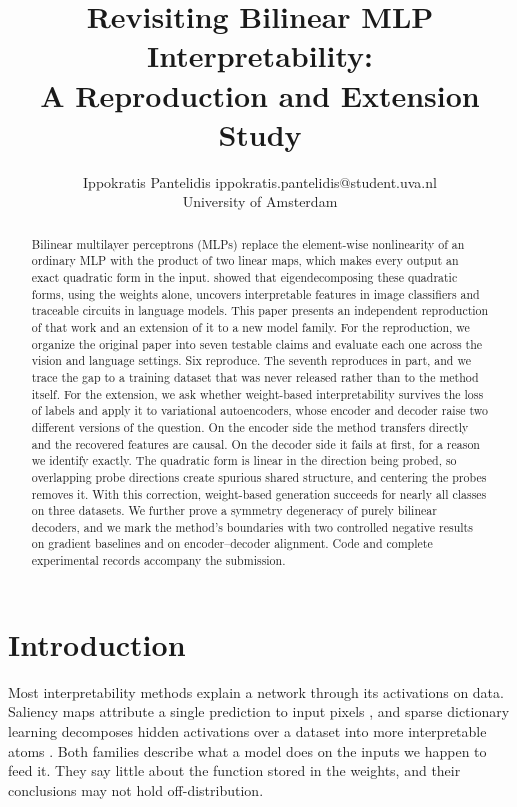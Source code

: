 \documentclass[10pt]{article} %
\title{Revisiting Bilinear MLP Interpretability: \\A Reproduction and Extension Study}
\author{\name Ippokratis Pantelidis \email ippokratis.pantelidis@student.uva.nl \\
      \addr University of Amsterdam}
\begin{document}
\maketitle

\begin{abstract}
Bilinear multilayer perceptrons (MLPs) replace the element-wise nonlinearity of an
ordinary MLP with the product of two linear maps, which makes every output an exact
quadratic form in the input. \citet{pearce2025bilinear} showed that eigendecomposing
these quadratic forms, using the weights alone, uncovers interpretable features in
image classifiers and traceable circuits in language models. This paper presents an
independent reproduction of that work and an extension of it to a new model family.
For the reproduction, we organize the original paper into seven testable claims and
evaluate each one across the vision and language settings. Six reproduce. The
seventh reproduces in part, and we trace the gap to a training dataset that was
never released rather than to the method itself. For the extension, we ask whether
weight-based interpretability survives the loss of labels and apply it to
variational autoencoders, whose encoder and decoder raise two different versions of
the question. On the encoder side the method transfers directly and the recovered
features are causal. On the decoder side it fails at first, for a reason we
identify exactly. The quadratic form is linear in the direction being probed, so
overlapping probe directions create spurious shared structure, and centering the
probes removes it. With this correction, weight-based generation succeeds for
nearly all classes on three datasets. We further prove a symmetry degeneracy of
purely bilinear decoders, and we mark the method's boundaries with two controlled
negative results on gradient baselines and on encoder--decoder alignment. Code and
complete experimental records accompany the submission.
\end{abstract}

\section{Introduction}

Most interpretability methods explain a network through its activations on data.
Saliency maps attribute a single prediction to input pixels \citep{simonyan2014deep},
and sparse dictionary learning decomposes hidden activations over a dataset into more
interpretable atoms \citep{bricken2023monosemanticity, cunningham2024sparse}. Both
families describe what a model does on the inputs we happen to feed it. They say
little about the function stored in the weights, and their conclusions may not hold
off-distribution.
\end{document}
